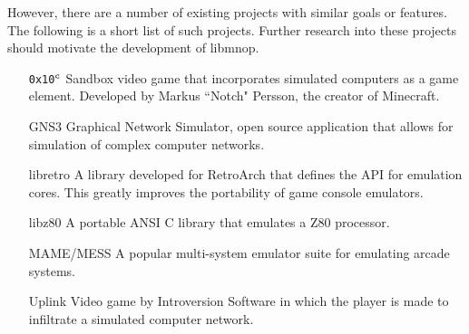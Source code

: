 \documentclass[12pt]{article}
\begin{document}
However, there are a number of existing projects with similar goals or features. The following is a short list of such projects. Further research into these projects should motivate the development of libmnop.
\begin{itemize}
\item[{\tt 0x10}$^\textrm{{\tt c}}$] Sandbox video game that incorporates simulated computers as a game element. Developed by Markus ``Notch" Persson, the creator of Minecraft.
\item[GNS3] Graphical Network Simulator, open source application that allows for simulation of complex computer networks.
\item[libretro] A library developed for RetroArch that defines the API for emulation cores. This greatly improves the portability of game console emulators.
\item[libz80] A portable ANSI C library that emulates a Z80 processor.
\item[MAME/MESS] A popular multi-system emulator suite for emulating arcade systems.
\item[Uplink] Video game by Introversion Software in which the player is made to infiltrate a simulated computer network.
\end{itemize}
\end{document}
